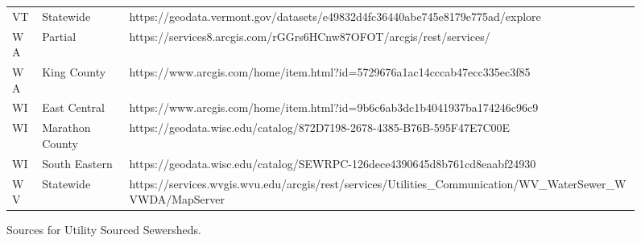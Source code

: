 \documentclass[
  letterpaper,
  DIV=11,
  numbers=noendperiod]{scrartcl}
\begin{document}
\begin{figure}
{\begin{table}
\begin{tabular*}{\linewidth}{@{\extracolsep{\fill}}lll}
VT & Statewide & https://geodata.vermont.gov/datasets/e49832d4fc36440abe745e8179e775ad/explore \\ 
WA & Partial & https://services8.arcgis.com/rGGrs6HCnw87OFOT/arcgis/rest/services/ \\ 
WA & King County  & https://www.arcgis.com/home/item.html?id=5729676a1ac14cccab47ecc335ec3f85 \\ 
WI & East Central & https://www.arcgis.com/home/item.html?id=9b6c6ab3dc1b4041937ba174246c96c9 \\ 
WI & Marathon County  & https://geodata.wisc.edu/catalog/872D7198-2678-4385-B76B-595F47E7C00E \\ 
WI & South Eastern  & https://geodata.wisc.edu/catalog/SEWRPC-126dece4390645d8b761cd8eaabf24930 \\ 
WV & Statewide & https://services.wvgis.wvu.edu/arcgis/rest/services/Utilities_Communication/WV_WaterSewer_WVWDA/MapServer \\ 
\bottomrule
\end{tabular*}
\end{table}

}

\caption{\label{fig-utilitySources}Sources for Utility Sourced
Sewersheds.}

\end{figure}%
\end{document}
